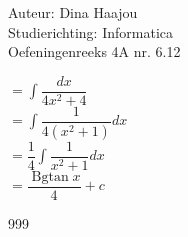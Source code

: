 \documentclass[a4paper]{article}
\begin{document}
\noindent \large Auteur: Dina Haajou \\
\noindent \large Studierichting: Informatica \\
\noindent \large Oefeningenreeks 4A nr. 6.12 \\

\medskip

\normalsize

$= \displaystyle\int \dfrac{dx}{4x^2 + 4}$ \\

$= \displaystyle\int \dfrac{1}{4(x^2 + 1)} dx$ \\

$= \dfrac{1}{4} \displaystyle\int \dfrac{1}{x^2 + 1} dx$ \\

$= \dfrac{\operatorname{Bgtan} x}{4} + c$ \\

\begin{thebibliography}{999}
\end{thebibliography}
\end{document}
